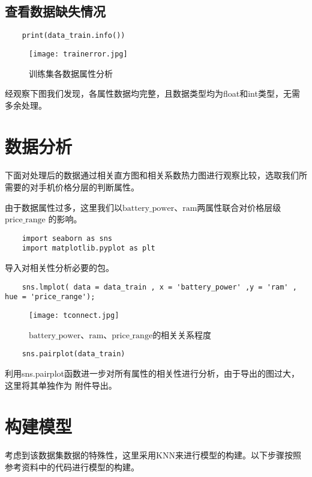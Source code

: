 \documentclass[AutoFakeBold]{LZUThesis}
\begin{document}
\section{查看数据缺失情况}
\begin{lstlisting}
    print(data_train.info())  
\end{lstlisting}
    \begin{figure}[htbp]
        \centering
        \texttt{[image: trainerror.jpg]}
        \caption{训练集各数据属性分析}
    \end{figure}

    经观察下图我们发现，各属性数据均完整，且数据类型均为float和int类型，无需多余处理。

\chapter{数据分析}
下面对处理后的数据通过相关直方图和相关系数热力图进行观察比较，选取我们所需要的对手机价格分层的判断属性。

由于数据属性过多，这里我们以$\mathrm{battery\_power}$、$\mathrm{ram}$两属性联合对价格层级$\mathrm{price\_range}$
的影响。

\begin{lstlisting}
    import seaborn as sns 
    import matplotlib.pyplot as plt 
\end{lstlisting}

导入对相关性分析必要的包。

\begin{lstlisting}
    sns.lmplot( data = data_train , x = 'battery_power' ,y = 'ram' , hue = 'price_range');
\end{lstlisting}
\begin{figure}[htbp]
    \centering
    \texttt{[image: tconnect.jpg]}
    \caption{$\mathrm{battery\_power}$、$\mathrm{ram}$、$\mathrm{price\_range}$的相关关系程度}
\end{figure}
\begin{lstlisting}
    sns.pairplot(data_train)
\end{lstlisting}

利用sns.pairplot函数进一步对所有属性的相关性进行分析，由于导出的图过大，这里将其单独作为
附件导出。

\chapter{构建模型}
考虑到该数据集数据的特殊性，这里采用KNN来进行模型的构建。以下步骤按照参考资料中的代码进行模型的构建。
\end{document}
